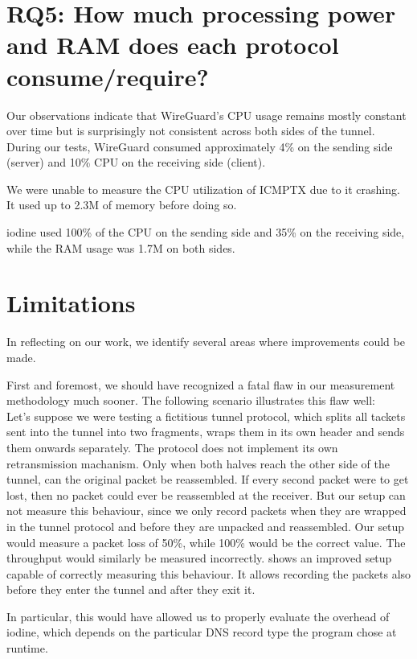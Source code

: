 \section{RQ5: How much processing power and RAM does each protocol consume/require?}
Our observations indicate that WireGuard's CPU usage remains mostly constant over time but is surprisingly not consistent across both sides of the tunnel.
During our tests, WireGuard consumed approximately 4\% on the sending side (server) and 10\% CPU on the receiving side (client).

We were unable to measure the CPU utilization of ICMPTX due to it crashing.
It used up to 2.3M of memory before doing so.

iodine used 100\% of the CPU on the sending side and 35\% on the receiving side, while the RAM usage was 1.7M on both sides.


\section{Limitations}
In reflecting on our work, we identify several areas where improvements could be made.

First and foremost, we should have recognized a fatal flaw in our measurement methodology much sooner.
The following scenario illustrates this flaw well:\\
Let's suppose we were testing a fictitious tunnel protocol, which splits all tackets sent into the tunnel into two fragments, wraps them in its own header and sends them onwards separately.
The protocol does not implement its own retransmission machanism.
Only when both halves reach the other side of the tunnel, can the original packet be reassembled.
If every second packet were to get lost, then no packet could ever be reassembled at the receiver.
But our setup can not measure this behaviour, since we only record packets when they are wrapped in the tunnel protocol and before they are unpacked and reassembled.
Our setup would measure a packet loss of 50\%, while 100\% would be the correct value.
The throughput would similarly be measured incorrectly.
 shows an improved setup capable of correctly measuring this behaviour.
It allows recording the packets also before they enter the tunnel and after they exit it.

In particular, this would have allowed us to properly evaluate the overhead of iodine, which depends on the particular DNS record type the program chose at runtime.


